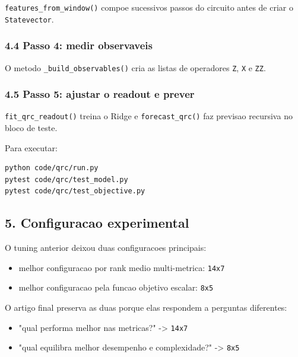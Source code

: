 \documentclass[12pt]{article}
\providecommand{\tightlist}{%
          \setlength{\itemsep}{0pt}\setlength{\parskip}{0pt}}
\begin{document}
\texttt{features\_from\_window()} compoe sucessivos passos do circuito antes de criar o \texttt{Statevector}.

\subsubsection{4.4 Passo 4: medir observaveis}\label{44-passo-4-medir-observaveis}

O metodo \texttt{\_build\_observables()} cria as listas de operadores \texttt{Z}, \texttt{X} e \texttt{ZZ}.

\subsubsection{4.5 Passo 5: ajustar o readout e prever}\label{45-passo-5-ajustar-o-readout-e-prever}

\texttt{fit\_qrc\_readout()} treina o Ridge e \texttt{forecast\_qrc()} faz previsao recursiva no bloco de teste.

Para executar:

\begin{verbatim}
python code/qrc/run.py
pytest code/qrc/test_model.py
pytest code/qrc/test_objective.py
\end{verbatim}

\subsection{5. Configuracao experimental}\label{5-configuracao-experimental}

O tuning anterior deixou duas configuracoes principais:

\begin{itemize}
\tightlist
\item
  melhor configuracao por rank medio multi-metrica: \texttt{14x7}
\item
  melhor configuracao pela funcao objetivo escalar: \texttt{8x5}
\end{itemize}

O artigo final preserva as duas porque elas respondem a perguntas diferentes:

\begin{itemize}
\tightlist
\item
  "qual performa melhor nas metricas?" -\textgreater{} \texttt{14x7}
\item
  "qual equilibra melhor desempenho e complexidade?" -\textgreater{} \texttt{8x5}
\end{itemize}
\end{document}
